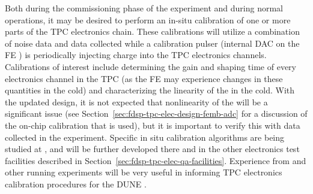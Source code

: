 Both during the commissioning phase of the experiment and during normal operations, it may
be desired to perform an in-situ calibration of one or more parts of the TPC electronics chain.
These calibrations will utilize a combination of noise data and data collected while a
calibration pulser (internal DAC on the FE ) is periodically injecting charge into the TPC
electronics channels.  Calibrations of interest include determining the gain and shaping time of
every electronics channel in the TPC (as the FE  may experience changes in these quantities
in the cold) and characterizing the linearity of the   in the cold.  With the updated  
design, it is not expected that nonlinearity of the  will be a significant issue (see
Section~\ref{sec:fdsp-tpc-elec-design-femb-adc} for a discussion of the on-chip calibration
that is used), but it is important to verify this with data collected in the experiment.
Specific in situ calibration algorithms are being studied at , and will be further
developed there and in the other electronics test facilities described in
Section~\ref{sec:fdsp-tpc-elec-qa-facilities}.  Experience from \microboone and other running
\lartpc experiments will be very useful in informing TPC electronics calibration procedures for
the DUNE .
